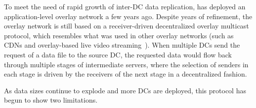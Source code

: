 To meet the need of rapid growth of inter-DC data replication,
\company has deployed an application-level
overlay network a few years ago.
Despite years of refinement, the overlay network
is still based on a receiver-driven decentralized
overlay multicast protocol, which
resembles what was used in other overlay networks
(such as CDNs and overlay-based live video
streaming~\cite{Andreev2013Designing,sripanidkulchai2004analysis,zhang2005coolstreaming}).
When multiple DCs send the request of a data file
to the source DC, the requested data would flow back
through multiple stages of
intermediate servers, where the selection of senders in each stage
is driven by the receivers of the next stage in a decentralized
fashion.

As data sizes continue to explode and more DCs are
deployed, this protocol has begun to show two limitations.


